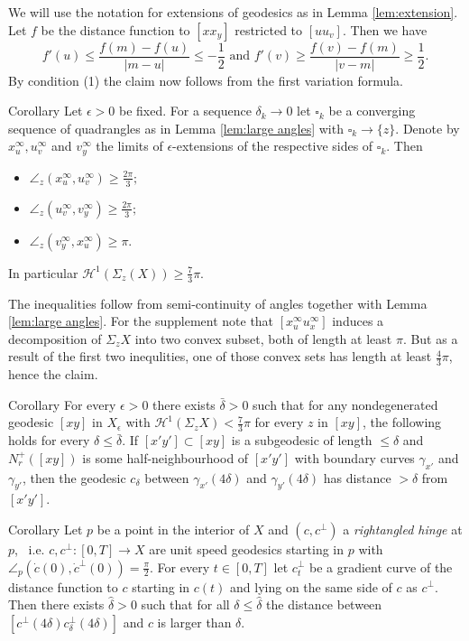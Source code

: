\documentclass[a4paper,10pt]{amsart}
\begin{document}
We will use the notation for extensions of geodesics as in Lemma \ref{lem:extension}.
Let $f$ be the distance function to $[x x_y]$ restricted to $[u u_v]$. Then we have
$$
f'(u)\leq\frac{f(m)-f(u)}{|m-u|}\leq-\frac{1}{2}\text{  and  }f'(v)\geq\frac{f(v)-f(m)}{|v-m|}\geq\frac{1}{2}.
$$
By condition (1) the claim now follows from the first variation formula.
\qeds

\begin{thm}{Corollary}
Let $\epsilon>0$ be fixed. For a sequence $\delta_k\to 0$ let $\square_k$ be a converging sequence of quadrangles
as in Lemma \ref{lem:large angles} with $\square_k\to \{z\}$. Denote by $x^\infty_u, u^\infty_v$ and $v^\infty_y$
the limits of $\epsilon$-extensions of the respective sides of $\square_k$. Then
\begin{itemize}
\item $\angle_z(x^\infty_u,u^\infty_v)\geq\frac{2\pi}{3};$
\item $\angle_z(u^\infty_v,v^\infty_y)\geq\frac{2\pi}{3};$
\item $\angle_z(v^\infty_y,x^\infty_u)\geq\pi.$
\end{itemize}
In particular $\mathcal{H}^1(\Sigma_z(X))\geq\frac{7}{3}\pi$.
\end{thm}
The inequalities follow from semi-continuity of angles together with Lemma \ref{lem:large angles}.
For the supplement note that $[x^\infty_u u^\infty_x]$ induces a decomposition of $\Sigma_z X$ into two convex subset, both of length at least $\pi$.
But as a result of the first two inequlities, one of those convex sets has length at least $\frac{4}{3}\pi$, hence the claim.
\qeds

\begin{thm}{Corollary}\label{cor:level distance 1}
For every $\epsilon>0$ there exists $\bar\delta>0$ such that for any nondegenerated geodesic $[xy]$ 
in $X_\epsilon$ with $\mathcal{H}^1(\Sigma_z X)< \frac{7}{3}\pi$
for every $z$ in $[xy]$, the following holds for every $\delta\leq\bar\delta$. 
If $[x'y']\subset[xy]$ is a subgeodesic of length $\leq\delta$ and $N^+_r([xy])$ is some half-neighbourhood 
of $[x'y']$ with boundary curves $\gamma_{x'}$ and $\gamma_{y'}$, 
then the geodesic $c_\delta$ between  $\gamma_{x'}(4\delta)$ and $\gamma_{y'}(4\delta)$ has distance $>\delta$
from $[x'y']$.
\end{thm}

\begin{thm}{Corollary}\label{cor:level distance 2}
Let $p$ be a point in the interior of $X$ and $(c,c^\perp)$ a {\em rightangled hinge} at $p$, \ i.e. $c,c^\perp:[0,T]\to X$ are unit speed geodesics starting in $p$
with $\angle_p(\dot c(0),\dot c^\perp (0))=\frac{\pi}{2}$. For every $t\in[0,T]$ let
$c^\perp_t$ be a gradient curve of the distance function to $c$ starting in $c(t)$ and lying on the same side
of $c$ as $c^\perp$. Then there exists $\hat\delta>0$ such that for all $\delta\leq\hat\delta$ the distance between 
$[c^\perp(4\delta)c^\perp_\delta(4\delta)]$
and $c$ is larger than $\delta$.
\end{thm}
\end{document}
